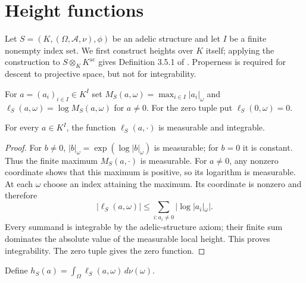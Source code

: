 \section{Height functions}

Let $S=(K,(\Omega,\mathcal A,\nu),\phi)$ be an adelic structure and
let $I$ be a finite nonempty index set. We first construct heights over
$K$ itself; applying the construction to $S\otimes_K K^{\mathrm{ac}}$
gives Definition 3.5.1 of \cite{chen-moriwaki}. Properness is required
for descent to projective space, but not for integrability.

\begin{definition}\label{def:local-height}
\leanok
For $a=(a_i)_{i\in I}\in K^I$ set
$M_S(a,\omega)=\max_{i\in I}|a_i|_\omega$ and
$\ell_S(a,\omega)=\log M_S(a,\omega)$ for $a\ne0$.
For the zero tuple put $\ell_S(0,\omega)=0$.
\end{definition}

\begin{lemma}
\label{lem:local-height-integrable}
\leanok
For every $a\in K^I$, the function $\ell_S(a,\cdot)$ is measurable
and integrable.
\end{lemma}
\begin{proof}
For $b\ne0$, $|b|_\omega=\exp(\log|b|_\omega)$ is measurable;
for $b=0$ it is constant. Thus the finite maximum $M_S(a,\cdot)$
is measurable. For $a\ne0$, any nonzero coordinate shows that this
maximum is positive, so its logarithm is measurable. At each $\omega$
choose an index attaining the maximum. Its coordinate is nonzero and
therefore
\[
 |\ell_S(a,\omega)|\leq
 \sum_{i:a_i\ne0}|\log|a_i|_\omega|.
\]
Every summand is integrable by the adelic-structure axiom; their finite
sum dominates the absolute value of the measurable local height.
This proves integrability. The zero tuple gives the zero function.
\end{proof}

\begin{definition}\label{def:tuple-height}
\leanok
Define $h_S(a)=\int_\Omega\ell_S(a,\omega)\,d\nu(\omega)$.
\end{definition}

